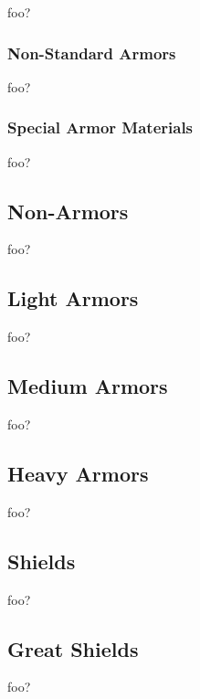 foo?

\subsubsection{Non-Standard Armors}

foo?

\subsubsection{Special Armor Materials}

foo?

\subsection{Non-Armors}

foo?

\subsection{Light Armors}

foo?

\subsection{Medium Armors}

foo?

\subsection{Heavy Armors}

foo?

\subsection{Shields}

foo?

\subsection{Great Shields}

foo?
